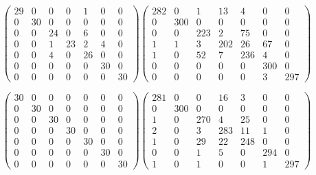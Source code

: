 \documentclass{article}
\begin{document}
	\begin{equation}
		\begin{pmatrix}
			29 & 0 & 0 & 0 & 1 & 0 & 0\\
			0 & 30 & 0 & 0 & 0 & 0 & 0\\
			0 & 0 & 24 & 0 & 6 & 0 & 0\\
			0 & 0 & 1 & 23 & 2 & 4 & 0\\
			0 & 0 & 4 & 0 & 26 & 0 & 0\\
			0 & 0 & 0 & 0 & 0 & 30 & 0\\
			0 & 0 & 0 & 0 & 0 & 0 & 30
		\end{pmatrix}
		\begin{pmatrix}
		282 & 0 & 1 & 13 & 4 & 0 & 0\\
		0 & 300 & 0 & 0 & 0 & 0 & 0\\
		0 & 0 & 223 & 2 & 75 & 0 & 0\\
		1 & 1 & 3 & 202 & 26 & 67 & 0\\
		1 & 0 & 52 & 7 & 236 & 4 & 0\\
		0 & 0 & 0 & 0 & 0 & 300 & 0\\
		0 & 0 & 0 & 0 & 0 & 3 & 297
		\end{pmatrix}
	\end{equation}
	
	\begin{equation}
	\begin{pmatrix}
	30 & 0 & 0 & 0 & 0 & 0 & 0\\
	0 & 30 & 0 & 0 & 0 & 0 & 0\\
	0 & 0 & 30 & 0 & 0 & 0 & 0\\
	0 & 0 & 0 & 30 & 0 & 0 & 0\\
	0 & 0 & 0 & 0 & 30 & 0 & 0\\
	0 & 0 & 0 & 0 & 0 & 30 & 0\\
	0 & 0 & 0 & 0 & 0 & 0 & 30
	\end{pmatrix}
	\begin{pmatrix}
	281 & 0 & 0 & 16 & 3 & 0 & 0\\
	0 & 300 & 0 & 0 & 0 & 0 & 0\\
	1 & 0 & 270 & 4 & 25 & 0 & 0\\
	2 & 0 & 3 & 283 & 11 & 1 & 0\\
	1 & 0 & 29 & 22 & 248 & 0 & 0\\
	0 & 0 & 1 & 5 & 0 & 294 & 0\\
	1 & 0 & 1 & 0 & 0 & 1 & 297
	\end{pmatrix}
	\end{equation}
	
\end{document}
